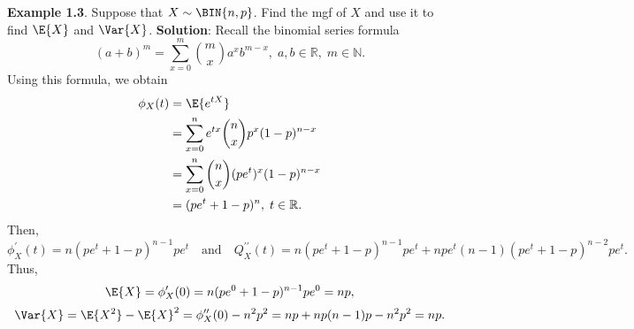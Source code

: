 \begin{Example}
    \textbf{Example 1.3}. Suppose that $ X \sim \BIN{n,p} $. Find the mgf of $ X $ and use it to find $ \E{X} $ and $ \Var{X} $.
    \tcblower{}
    \textbf{Solution}: Recall the binomial series formula
    \[ (a+b)^m=\sum_{x=0}^{m} \binom{m}{x}a^x b^{m-x},\;a,b\in\mathbb{R},\; m\in\mathbb{N}. \]
    Using this formula, we obtain
    \begin{align*}
        \phi_X(t)
         & =\E{e^{tX}}                                       \\
         & =\sum_{x=0}^{n}e^{tx}\binom{n}{x}p^x(1-p)^{n-x}   \\
         & =\sum_{x=0}^{n} \binom{n}{x}(p e^t)^x (1-p)^{n-x} \\
         & =(p e^t+1-p)^n,\; t\in\mathbb{R}.
    \end{align*}
    Then,
    \[ \phi_X^\prime(t)=n(p e^t+1-p)^{n-1}pe^t\quad \text{and}\quad Q_X^{\prime\prime}(t)=n(pe^t+1-p)^{n-1}pe^t+npe^t(n-1)(pe^t+1-p)^{n-2}pe^t. \]
    Thus,
    \[ \E{X}=\phi_X^\prime(0)=n(pe^0+1-p)^{n-1}pe^0=np, \]
    \[ \Var{X}=\E{X^2}-\E{X}^2=\phi_X^{\prime\prime}(0)-n^2p^2=np+np(n-1)p-n^2p^2=np. \]
\end{Example}
